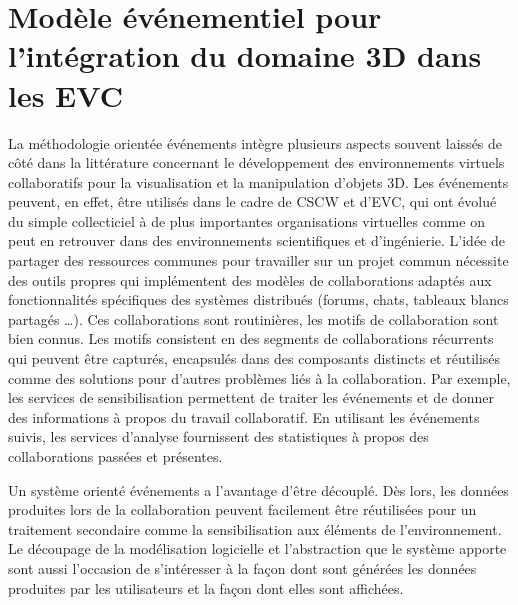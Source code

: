 
\section{Modèle événementiel pour l'intégration du domaine 3D dans les 
EVC}
\label{sec:modele_event}
La méthodologie orientée événements intègre plusieurs aspects souvent laissés 
de côté dans la littérature concernant le développement des environnements 
virtuels collaboratifs pour la visualisation et la manipulation d'objets \gls{3D}. 
Les événements peuvent, en effet, être utilisés dans le cadre de \gls{CSCW} et 
d'\gls{EVC}, qui ont évolué du simple collecticiel à de plus importantes 
organisations virtuelles comme on peut en retrouver dans des environnements 
scientifiques et d'ingénierie. L'idée de partager des ressources communes pour 
travailler sur un projet commun nécessite des outils propres qui implémentent 
des modèles de collaborations adaptés aux fonctionnalités spécifiques des 
systèmes distribués (forums, chats, tableaux blancs partagés \dots). Ces 
collaborations sont routinières, les motifs de collaboration sont bien connus. Les 
motifs consistent en des segments de collaborations récurrents qui peuvent être 
capturés, encapsulés dans des composants distincts et réutilisés comme des 
solutions pour d'autres problèmes liés à la collaboration. Par exemple, les services 
de sensibilisation permettent de traiter les événements et de donner des informations 
à propos du travail collaboratif. En utilisant les événements suivis, les services 
d'analyse fournissent des statistiques à propos des collaborations passées et 
présentes.


Un système orienté événements a l'avantage d'être découplé. Dès 
lors, les données produites lors de la collaboration peuvent facilement être 
réutilisées pour un traitement secondaire comme la sensibilisation aux éléments 
de l'environnement. 
Le découpage de la modélisation logicielle et l'abstraction que le système apporte sont aussi l'occasion de s'intéresser à la façon dont sont générées les données produites par 
les utilisateurs et la façon dont elles sont affichées. 

